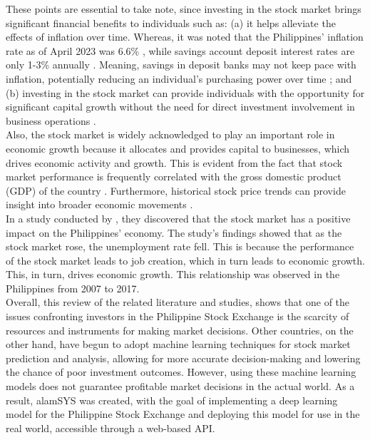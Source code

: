 These points are essential to take note, since investing in the stock market brings 
significant financial benefits to individuals such as: 
(a) it helps alleviate the effects of inflation over time. Whereas, it was noted 
that the Philippines' inflation rate as of April 2023 was 6.6\% \cite{NEDA2023}, 
while savings account  deposit interest rates are only 1-3\% annually \cite{BSP19}. 
Meaning, savings in deposit banks may not keep pace with inflation, 
potentially reducing an individual's purchasing power over time \cite{RBC, EdwardJones}; 
and (b) investing in the stock market can provide individuals with the opportunity for 
significant capital growth without the need for direct investment involvement in 
business operations \cite{USSecAndExComm}.
\\

Also, the stock market is widely acknowledged to play an important role in economic 
growth because it allocates and provides capital to businesses, which drives economic 
activity and growth. This is evident from the fact that stock market performance 
is frequently correlated with the gross domestic product (GDP) of the country
\cite{TradeBrains, Hall2022, Bae2017}.
Furthermore, historical stock price trends can provide insight 
into broader economic movements
\cite{Campbell2021}.
\\

In a study conducted by , they discovered that the stock market
has a positive impact on the Philippines' economy. The study's findings showed that
as the stock market rose, the unemployment rate fell. This is because the performance 
of the stock market leads to job creation, which in turn leads to economic growth.
This, in turn, drives economic growth. This relationship was observed
in the Philippines from 2007 to 2017.
\\

Overall, this review of the related literature and studies, shows that one of the issues 
confronting investors in the Philippine Stock Exchange is the scarcity of resources and 
instruments for making market decisions. Other countries, on the other hand, have begun to 
adopt machine learning techniques for stock market prediction and analysis, allowing for 
more accurate decision-making and lowering the chance of poor investment outcomes. 
However, using these machine learning models does not guarantee profitable market decisions in 
the actual world. As a result, alamSYS was created, with the goal of implementing a deep 
learning model for the Philippine Stock Exchange and deploying this model for use in the 
real world, accessible through a web-based API.
\\

